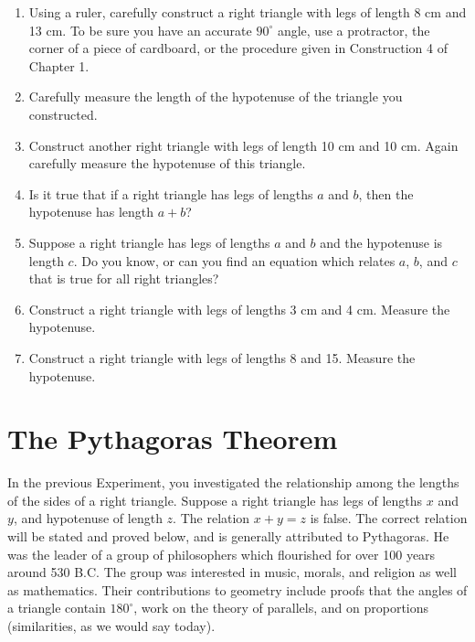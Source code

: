 \documentclass[12pt]{book} %
\begin{document}
\begin{enumerate}
\item Using a ruler, carefully construct a right triangle with legs of length 8 cm and 13 cm. To be sure you have an accurate $90^\circ$ angle, use a protractor, the corner of a piece of cardboard, or the procedure given in Construction 4 of Chapter 1.

\item Carefully measure the length of the hypotenuse of the triangle you constructed.

\item Construct another right triangle with legs of length 10 cm and 10 cm. Again carefully measure the hypotenuse of this triangle.

\item Is it true that if a right triangle has legs of lengths $a$ and $b$, then the hypotenuse has length $a+b$?

\item Suppose a right triangle has legs of lengths $a$ and $b$ and the hypotenuse is length $c$. Do you know, or can you find an equation which relates $a$, $b$, and $c$ that is true for all right triangles?

\item Construct a right triangle with legs of lengths 3 cm and 4 cm. Measure the hypotenuse.

\item Construct a right triangle with legs of lengths 8 and 15. Measure the hypotenuse.
\end{enumerate}

\section{The Pythagoras Theorem}

In the previous Experiment, you investigated the relationship among the lengths of the sides of a right triangle. Suppose a right triangle has legs of lengths $x$ and $y$, and hypotenuse of length $z$. The relation $x+y=z$ is false. The correct relation will be stated and proved below, and is generally attributed to Pythagoras. He was the leader of a group of philosophers which flourished for over 100 years around 530 B.C. The group was interested in music, morals, and religion as well as mathematics. Their contributions to geometry include proofs that the angles of a triangle contain $180^\circ$, work on the theory of parallels, and on proportions (similarities, as we would say today).
\end{document}
